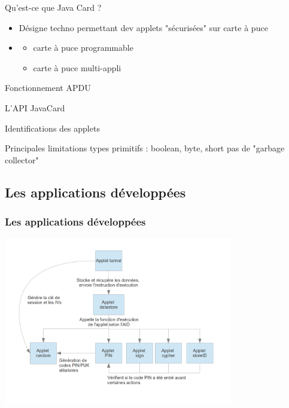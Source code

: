 \documentclass{beamer}
\begin{document}
\begin{frame}
    \begin{block}{Qu'est-ce que Java Card ?}
        \begin{itemize}
            \item Désigne techno permettant dev applets "sécurisées"
                sur carte à puce 

            \item 
                \begin{itemize}
                    \item carte à puce programmable 
                    \item carte à puce multi-appli
                \end{itemize}
        \end{itemize}
    \end{block}
\end{frame}

\begin{frame}
    \begin{block}{Fonctionnement}
        APDU


        L'API JavaCard
            


        Identifications des applets
    \end{block}
\end{frame}

\begin{frame}
    \begin{block}{Principales limitations}
        types primitifs : boolean, byte, short
        pas de "garbage collector"

    \end{block}
\end{frame}

\subsection{Les applications développées}
\begin{frame}
    \frametitle{Les applications développées}
    \includegraphics[width=10cm]{graphe_dep}
    \begin{block}{}
    \end{block}
\end{frame}
\end{document}
